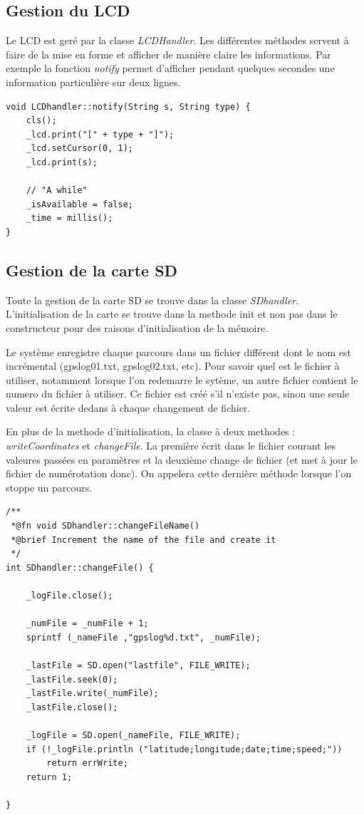 \documentclass[a4paper,12pt,titlepage]{article}
\begin{document}
\subsection{Gestion du LCD}

Le LCD est geré par la classe \emph{LCDHandler}. Les différentes méthodes servent à faire de la mise en forme et afficher de manière claire les informations.
Par exemple la fonction \emph{notify} permet d'afficher pendant quelques secondes une information particulière sur deux lignes.

\begin{lstlisting}[caption={notify}, label={notify}]
void LCDhandler::notify(String s, String type) {
    cls();
    _lcd.print("[" + type + "]");
    _lcd.setCursor(0, 1);
    _lcd.print(s);

    // "A while"
    _isAvailable = false;
    _time = millis();
}

\end{lstlisting}

\subsection{Gestion de la carte SD}

Toute la gestion de la carte SD se trouve dans la classe \emph{SDhandler}.
L'initialisation de la carte se trouve dans la methode init et non pas dans le constructeur pour des raisons d'initialisation de la mémoire.

Le système enregistre chaque parcours dans un fichier différent dont le nom est incrémental (gpslog01.txt, gpslog02.txt, etc). 
Pour savoir quel est le fichier à utiliser, notamment lorsque l'on redemarre le sytème, un autre fichier contient le numero du fichier à utiliser.
Ce fichier est créé s'il n'existe pas, sinon une seule valeur est écrite dedans à chaque changement de fichier.

En plus de la methode d'initialisation, la classe à deux methodes : \emph{writeCoordinates} et \emph{changeFile}.
La première écrit dans le fichier courant les valeures passées en paramètres et la deuxième change de fichier (et met à jour le fichier de numérotation donc).
On appelera cette dernière méthode lorsque l'on stoppe un parcours.


\begin{lstlisting}[caption={changeFile}, label={changeFile}]
/**
 *@fn void SDhandler::changeFileName()
 *@brief Increment the name of the file and create it
 */
int SDhandler::changeFile() {

    _logFile.close();

    _numFile = _numFile + 1;
    sprintf (_nameFile ,"gpslog%d.txt", _numFile);

    _lastFile = SD.open("lastfile", FILE_WRITE);
    _lastFile.seek(0);
    _lastFile.write(_numFile);
    _lastFile.close();

    _logFile = SD.open(_nameFile, FILE_WRITE);
    if (!_logFile.println ("latitude;longitude;date;time;speed;"))
        return errWrite;
    return 1;

}
\end{lstlisting}
\end{document}
